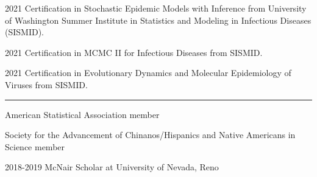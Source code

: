\documentclass{article}
\begin{document}
	
	
	
	\begin{description}
		\vspace{-2mm}
		\item[Certifications]\hspace*{.01in}
		
		2021 Certification in Stochastic Epidemic Models with Inference from University of Washington Summer Institute in Statistics and Modeling in Infectious Diseases (SISMID).
		\vspace*{1mm}
		
		2021 Certification in MCMC II for Infectious Diseases from SISMID.
		\vspace*{1mm}
		
		2021 Certification in Evolutionary Dynamics and Molecular Epidemiology of Viruses from SISMID.
		
	\end{description}
	\vspace{-2mm}
	\rule{\linewidth}{1pt}
	
	
	
	
	\begin{description}
		\vspace{-2mm}
		\item[Programs and Professional Membership]\hspace*{.01in}
		
		American Statistical Association member
		\vspace*{1mm}
		
		Society for the Advancement of Chinanos/Hispanics and Native Americans in Science member
		\vspace*{1mm}
		
		2018-2019 McNair Scholar at University of Nevada, Reno
		
	\end{description}
	
	
	
	
\end{document}
